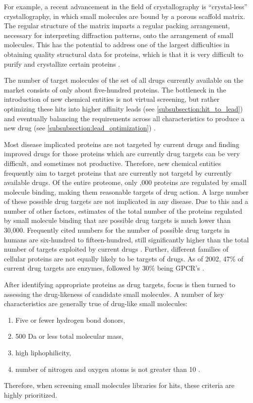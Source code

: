 For example, a recent advancement in the field of crystallography is ``crystal-less'' crystallography, in which small molecules are bound by a porous scaffold matrix.
The regular structure of the matrix imparts a regular packing arrangement, necessary for interpreting diffraction patterns, onto the arrangement of small molecules.
This has the potential to address one of the largest difficulties in obtaining quality structural data for proteins, which is that it is very difficult to purify and crystallize certain proteins \cite{inokuma2013x}.

The number of target molecules of the set of all drugs currently available on the market consists of only about five-hundred proteins.
The bottleneck in the introduction of new chemical entities is not virtual screening, but rather optimizing these hits into higher affinity leads (see \ref{subsubsection:hit_to_lead}) and eventually balancing the requirements across all characteristics to produce a new drug (see \ref{subsubsection:lead_optimization}) \cite{bleicher2003hit}.

Most disease implicated proteins are not targeted by current drugs and finding improved drugs for those proteins which are currently drug targets can be very difficult, and sometimes not productive. 
Therefore, new chemical entities frequently aim to target proteins that are currently not targetd by currently available drugs. 
Of the entire proteome, only ,000 proteins are regulated by small molecule binding, making them reasonable targets of drug action.
A large number of these possible drug targets are not implicated in any disease.
Due to this and a number of other factors, estimates of the total number of the proteins regulated by small molecule binding that are possible drug targets is much lower than 30,000.
Frequently cited numbers for the number of possible drug targets in humans are six-hundred to fifteen-hundred, still significantly higher than the total number of targets exploited by current drugs \cite{imming2006drugs,overington2006many}.
Further, different families of cellular proteins are not equally likely to be targets of drugs.
As of 2002, 47\% of current drug targets are enzymes, followed by 30\% being GPCR's \cite{hopkins2002druggable}.

After identifying appropriate proteins as drug targets, focus is then turned to assessing the drug-likeness of candidate small molecules.
A number of key characteristics are generally true of drug-like small molecules:
\begin{enumerate}
\item Five or fewer hydrogen bond donors,
\item 500 Da or less total molecular mass,
\item high liphophilicity,
\item number of nitrogen and oxygen atoms is not greater than 10 \cite{rule_of_five}.
\end{enumerate}
Therefore, when screening small molecules libraries for hits, these criteria are highly prioritized.

